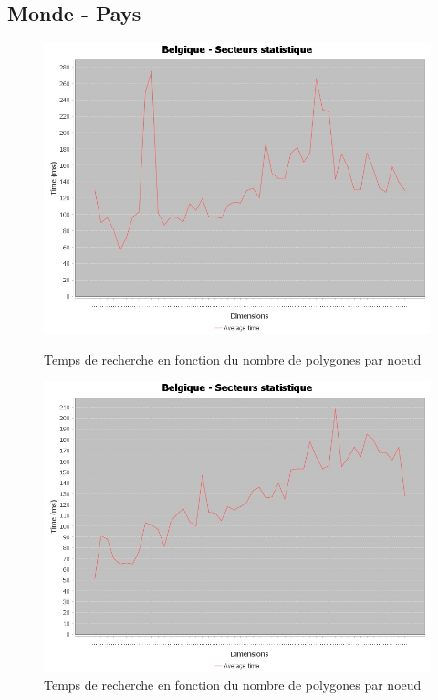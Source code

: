 \documentclass {article}
\begin{document}

\subsection {Monde - Pays}\label{mondePays}

\begin{figure}[h]
    \begin{minipage}[t]{0.46\textwidth}
	\centering
	\includegraphics[width=\textwidth]{graph_lineaire_Belgique.png}
	\caption{Temps de recherche en fonction du nombre de polygones par noeud}
	\label{fig:belgique_stat_find_lin}
    \end{minipage}
    \begin{minipage}[t]{0.46\textwidth}
	\centering
	\includegraphics[width=\textwidth]{graph_quadratique_Belgique.png}
	\caption{Temps de recherche en fonction du nombre de polygones par noeud}
	\label{fig:belgique_stat_find_quad}
    \end{minipage}
\end{figure}
\end{document}
